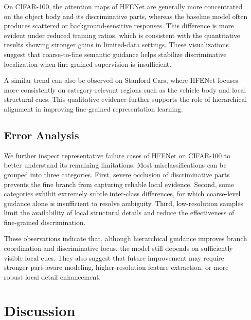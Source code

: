 \documentclass[pdflatex,iicol,sn-mathphys-num]{sn-jnl}
\theoremstyle{thmstyleone}%
\theoremstyle{thmstyletwo}%
\theoremstyle{thmstylethree}%
\begin{document}
On CIFAR-100, the attention maps of HFENet are generally more concentrated on the object body and its discriminative parts, whereas the baseline model often produces scattered or background-sensitive responses. 
This difference is more evident under reduced training ratios, which is consistent with the quantitative results showing stronger gains in limited-data settings. 
These visualizations suggest that coarse-to-fine semantic guidance helps stabilize discriminative localization when fine-grained supervision is insufficient.


A similar trend can also be observed on Stanford Cars, where HFENet focuses more consistently on category-relevant regions such as the vehicle body and local structural cues. 
This qualitative evidence further supports the role of hierarchical alignment in improving fine-grained representation learning.

\subsection{Error Analysis}

We further inspect representative failure cases of HFENet on CIFAR-100 to better understand its remaining limitations. 
Most misclassifications can be grouped into three categories. 
First, severe occlusion of discriminative parts prevents the fine branch from capturing reliable local evidence. 
Second, some categories exhibit extremely subtle inter-class differences, for which coarse-level guidance alone is insufficient to resolve ambiguity. 
Third, low-resolution samples limit the availability of local structural details and reduce the effectiveness of fine-grained discrimination.

These observations indicate that, although hierarchical guidance improves branch coordination and discriminative focus, the model still depends on sufficiently visible local cues. 
They also suggest that future improvement may require stronger part-aware modeling, higher-resolution feature extraction, or more robust local detail enhancement.

\section{Discussion}
\label{sec:discussion}
\end{document}
